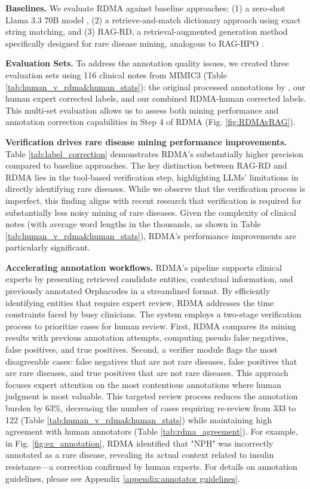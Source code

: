 \textbf{Baselines.} We evaluate RDMA against  baseline approaches: (1) a zero-shot Llama 3.3 70B model \cite{grattafiori2024llama3herdmodels}, (2) a retrieve-and-match dictionary approach using exact string matching, and (3) RAG-RD, a retrieval-augmented generation method specifically designed for rare disease mining, analogous to RAG-HPO \cite{garcia2024_HPORAG}.

\textbf{Evaluation Sets.} To address the annotation quality issues, we created three evaluation sets using 116 clinical notes from MIMIC3 (Table \ref{tab:human_v_rdma&human_stats}): the original processed annotations by \cite{dong2023ontology_poor_annotations}, our human expert corrected labels, and our combined RDMA-human corrected labels. This multi-set evaluation allows us to assess both mining performance and annotation correction capabilities in Step 4 of RDMA (Fig. \ref{fig:RDMAvRAG}).

\textbf{Verification drives rare disease mining performance improvements.} Table \ref{tab:label_correction} demonstrates RDMA's substantially higher precision compared to baseline approaches. The key distinction between RAG-RD and RDMA lies in the tool-based verification step, highlighting LLMs' limitations in directly identifying rare diseases. While we observe that the verification process is imperfect, this finding aligns with recent research \cite{wu2024hybrid} that verification is required for substantially less noisy mining of rare diseases. Given the complexity of clinical notes (with average word lengths in the thousands, as shown in Table \ref{tab:human_v_rdma&human_stats}), RDMA's performance improvements are particularly significant.

\textbf{Accelerating annotation workflows.} RDMA's pipeline supports clinical experts by presenting retrieved candidate entities, contextual information, and previously annotated Orphacodes in a streamlined format. By efficiently identifying entities that require expert review, RDMA addresses the time constraints faced by busy clinicians.
The system employs a two-stage verification process to prioritize cases for human review. First, RDMA compares its mining results with previous annotation attempts, computing pseudo false negatives, false positives, and true positives. Second, a verifier module flags the most disagreeable cases: false negatives that are not rare diseases, false positives that are rare diseases, and true positives that are not rare diseases. This approach focuses expert attention on the most contentious annotations where human judgment is most valuable.
This targeted review process reduces the annotation burden by 63\%, decreasing the number of cases requiring re-review from 333 to 122 (Table \ref{tab:human_v_rdma&human_stats}) while maintaining high agreement with human annotators (Table \ref{tab:rdma_agreement}). For example, in Fig. \ref{fig:ex_annotation}, RDMA identified that "NPH" was incorrectly annotated as a rare disease, revealing its actual context related to insulin resistance—a correction confirmed by human experts. For details on annotation guidelines, please see Appendix \ref{appendix:annotator guidelines}.

